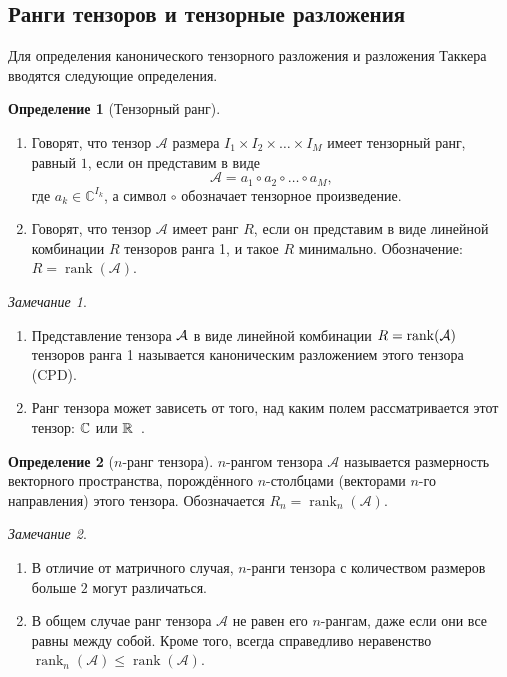 \documentclass[specialist,
    substylefile = spbu.rtx,
    subf,href,colorlinks=true, 12pt]{disser}
\theoremstyle{plain}
\theoremstyle{definition}
\newtheorem{definition}{Определение}[section]
\theoremstyle{remark}
\newtheorem*{remark}{Замечание}
\begin{document}
    \subsection{Ранги тензоров и тензорные разложения}\label{subsec:tensor-ranks}
    Для определения канонического тензорного разложения и разложения Таккера вводятся следующие определения.
    \newpage
    \begin{definition}[Тензорный ранг]
        \leavevmode
        \begin{enumerate}
            \item Говорят, что тензор $\mathcal{A}$ размера $I_1\times I_2\times \ldots \times I_M$ имеет тензорный ранг, равный $1$, если он представим в виде
            \[
            \mathcal{A}=a_1\circ a_2\circ \ldots \circ a_M,
            \]
            где $a_{k} \in \mathbb{C}^{I_k}$, а символ $\circ$ обозначает тензорное произведение.
            \item Говорят, что тензор $\mathcal{A}$ имеет ранг $R$, если он представим в виде линейной комбинации $R$ тензоров
            ранга 1, и такое $R$ минимально.
            Обозначение: $R=\operatorname{rank}(\mathcal{A})$.
        \end{enumerate}
    \end{definition}
    \begin{remark}
        \begin{enumerate}
            \item Представление тензора $\mathcal{A}$ в виде линейной комбинации $R = \operatorname{rank}(\mathcal{A})$ тензоров ранга 1 называется каноническим разложением этого тензора (CPD).
            \item Ранг тензора может зависеть от того, над каким полем рассматривается этот тензор:
            $\mathbb{C}$ или $\mathbb{R}$~\cite{tensors-bg}.
        \end{enumerate}
    \end{remark}

    \begin{definition}[$n$-ранг тензора]
        $n$-рангом тензора $\mathcal{A}$ называется размерность векторного пространства, порождённого
        $n$-столбцами (векторами $n$-го направления) этого тензора.
        Обозначается $R_n=\operatorname{rank}_{n}(\mathcal{A})$.
    \end{definition}

    \begin{remark}
        \begin{enumerate}
            \item В отличие от матричного случая, $n$-ранги тензора с количеством размеров больше $2$ могут различаться.
            \item В общем случае ранг тензора $\mathcal{A}$ не равен его $n$-рангам, даже если они все равны между
            собой.
            Кроме того, всегда справедливо неравенство
            $\operatorname{rank}_n(\mathcal{A})\leqslant \operatorname{rank}(\mathcal{A})$.
        \end{enumerate}
    \end{remark}
\end{document}
